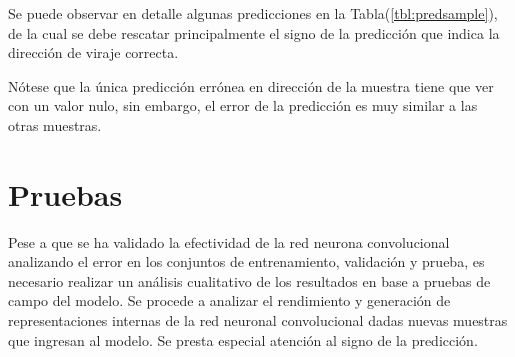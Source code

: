     Se puede observar en detalle algunas predicciones en la Tabla(\ref{tbl:predsample}), de la cual se debe rescatar principalmente el signo 
    de la predicción que indica la dirección de viraje correcta.

    \begin{table}[]
        \centering
        \caption[Muestra de predicciones de la red convolucional.]{Muestra de predicciones de la red convolucional. Fuente: Elaboración propia.}
        \label{tbl:predsample}
    \end{table}

    Nótese que la única predicción errónea en dirección de la muestra tiene que ver con un valor nulo, sin embargo, el error 
    de la predicción es muy similar a las otras muestras.
\section{Pruebas}\label{sec:analisistest}

Pese a que se ha validado la efectividad de la red neurona convolucional analizando el error en los conjuntos de entrenamiento, 
validación y prueba, es necesario realizar un análisis cualitativo de los resultados en base a pruebas de campo del modelo.
Se procede a analizar el rendimiento y generación de representaciones internas de la red neuronal convolucional dadas 
nuevas muestras que ingresan al modelo. Se presta especial atención al signo de la predicción.


